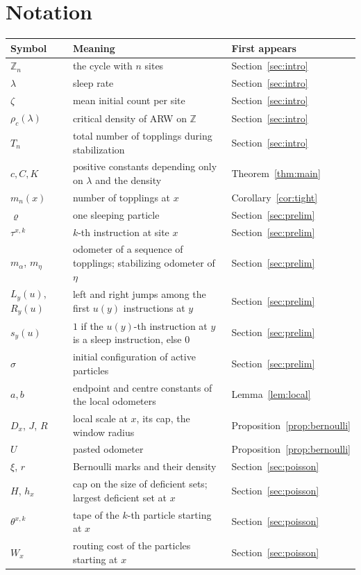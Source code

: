 \documentclass[11pt]{amsart}
\theoremstyle{remark}
\newcommand{\Z}{\mathbb Z}
\newcommand{\sleep}{\varrho}
\begin{document}
\appendix
\section{Notation}

\begin{center}
\begin{tabular}{@{}lp{}l@{}}
\toprule
Symbol & Meaning & First appears\\
\midrule
$\Z_n$ & the cycle with $n$ sites & Section~\ref{sec:intro}\\
$\lambda$ & sleep rate & Section~\ref{sec:intro}\\
$\zeta$ & mean initial count per site & Section~\ref{sec:intro}\\
$\rho_c(\lambda)$ & critical density of ARW on $\Z$ & Section~\ref{sec:intro}\\
$T_n$ & total number of topplings during stabilization & Section~\ref{sec:intro}\\
$c,C,K$ & positive constants depending only on $\lambda$ and the density & Theorem~\ref{thm:main}\\
$m_n(x)$ & number of topplings at $x$ & Corollary~\ref{cor:tight}\\
$\sleep$ & one sleeping particle & Section~\ref{sec:prelim}\\
$\tau^{x,k}$ & $k$-th instruction at site $x$ & Section~\ref{sec:prelim}\\
$m_\alpha$, $m_\eta$ & odometer of a sequence of topplings; stabilizing odometer of $\eta$ & Section~\ref{sec:prelim}\\
$L_y(u)$, $R_y(u)$ & left and right jumps among the first $u(y)$ instructions at $y$ & Section~\ref{sec:prelim}\\
$s_y(u)$ & $1$ if the $u(y)$-th instruction at $y$ is a sleep instruction, else $0$ & Section~\ref{sec:prelim}\\
$\sigma$ & initial configuration of active particles & Section~\ref{sec:prelim}\\
$a,b$ & endpoint and centre constants of the local odometers & Lemma~\ref{lem:local}\\
$D_x$, $J$, $R$ & local scale at $x$, its cap, the window radius & Proposition~\ref{prop:bernoulli}\\
$U$ & pasted odometer & Proposition~\ref{prop:bernoulli}\\
$\xi$, $r$ & Bernoulli marks and their density & Section~\ref{sec:poisson}\\
$H$, $h_x$ & cap on the size of deficient sets; largest deficient set at $x$ & Section~\ref{sec:poisson}\\
$\theta^{x,k}$ & tape of the $k$-th particle starting at $x$ & Section~\ref{sec:poisson}\\
$W_x$ & routing cost of the particles starting at $x$ & Section~\ref{sec:poisson}\\
\bottomrule
\end{tabular}
\end{center}
\end{document}

